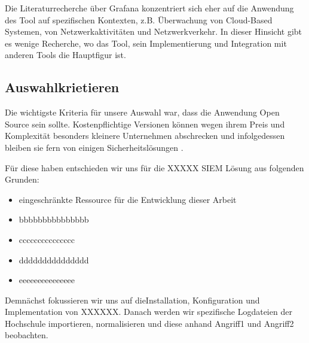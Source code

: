 Die Literaturrecherche über Grafana konzentriert sich eher auf die Anwendung des Tool auf spezifischen Kontexten, z.B. Überwachung von Cloud-Based Systemen, von Netzwerkaktivitäten und Netzwerkverkehr. In dieser Hinsicht gibt es wenige Recherche, wo das Tool, sein Implementierung und Integration mit anderen Tools die Hauptfigur ist.

\subsection{Auswahlkrietieren}
Die wichtigste Kriteria für unsere Auswahl war, dass die Anwendung \gls{Open Source} sein sollte. Kostenpflichtige Versionen können wegen ihrem Preis und Komplexität besonders kleinere Unternehmen abschrecken und infolgedessen bleiben sie fern von einigen Sicherheitslösungen \citep{Bjork_OSSIEM}.

Für diese haben entschieden wir uns für die XXXXX \gls{SIEM} Lösung aus folgenden Grunden:

\begin{itemize}[noitemsep]
   \item eingeschränkte Ressource für die Entwicklung dieser Arbeit
   \item bbbbbbbbbbbbbbb
   \item ccccccccccccccc
   \item ddddddddddddddd
   \item eeeeeeeeeeeeeee
\end{itemize}

Demnächst fokussieren wir uns auf dieInstallation, Konfiguration und Implementation von XXXXXX. Danach werden wir spezifische Logdateien der Hochschule importieren, normalisieren und diese anhand Angriff1 und Angriff2 beobachten.